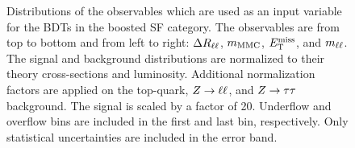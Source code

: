 \begin{figure}[htb]
\begin{subfigure}[t]{0.45\textwidth}
    \end{subfigure}
    \caption{Distributions of the observables which are used as an input variable for the BDTs in the boosted SF category.
             The observables are from top to bottom and from left to right: $\Delta R_{\ell\ell}$, $m_\text{MMC}$, $E_\text{T}^\text{miss}$, and $m_{\ell\ell}$.
             The signal and background distributions are normalized to their theory cross-sections and luminosity.
             Additional normalization factors are applied on the top-quark, $Z \to \ell \ell$, and $Z \to \tau \tau$ background.
             The signal is scaled by a factor of 20.
             Underflow and overflow bins are included in the first and last bin, respectively.
             Only statistical uncertainties are included in the error band.}\label{fig:mva:modeling:sr:boostsf}
\end{figure}

